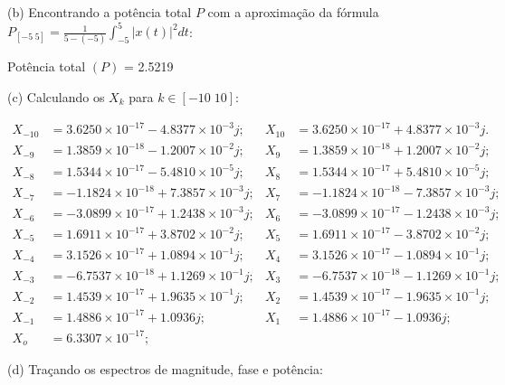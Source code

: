 \documentclass{article}
\begin{document}
\vspace{\baselineskip}

(b) Encontrando a potência total $P$ com a aproximação da fórmula $P_{[-5\;5]} = \frac{1}{5 - (-5)} \int_{-5}^{5} |x(t)|^2 dt $:

\vspace{\baselineskip}

Potência total $(P)$ = 2.5219

\vspace{\baselineskip}

(c) Calculando os $X_{k}$ para $k \in [-10\;10]$:

\begin{align*}
    X_{-10} &=  3.6250 \times 10^{-17} - 4.8377\times 10^{-3}j; & X_{10} &=  3.6250\times 10^{-17} + 4.8377\times 10^{-3}j.\\
    X_{-9} &=  1.3859\times 10^{-18} - 1.2007\times 10^{-2}j;   & X_{9} &=  1.3859\times 10^{-18} + 1.2007\times 10^{-2}j;\\
    X_{-8} &=  1.5344\times 10^{-17} - 5.4810\times 10^{-5}j;   & X_{8} &=  1.5344\times 10^{-17} + 5.4810\times 10^{-5}j;\\
    X_{-7} &= -1.1824\times 10^{-18} + 7.3857\times 10^{-3}j;   & X_{7} &= -1.1824\times 10^{-18} - 7.3857\times 10^{-3}j;\\
    X_{-6} &= -3.0899\times 10^{-17} + 1.2438\times 10^{-3}j;   & X_{6} &= -3.0899\times 10^{-17} - 1.2438\times 10^{-3}j;\\
    X_{-5} &=  1.6911\times 10^{-17} + 3.8702\times 10^{-2}j;   & X_{5} &=  1.6911\times 10^{-17} - 3.8702\times 10^{-2}j;\\
    X_{-4} &=  3.1526\times 10^{-17} + 1.0894\times 10^{-1}j;   & X_{4} &=  3.1526\times 10^{-17} - 1.0894\times 10^{-1}j;\\
    X_{-3} &= -6.7537\times 10^{-18} + 1.1269\times 10^{-1}j;   & X_{3} &= -6.7537\times 10^{-18} - 1.1269\times 10^{-1}j;\\
    X_{-2} &=  1.4539\times 10^{-17} + 1.9635\times 10^{-1}j;   & X_{2} &=  1.4539\times 10^{-17} - 1.9635\times 10^{-1}j;\\
    X_{-1} &=  1.4886\times 10^{-17} + 1.0936j;                  & X_{1} &=  1.4886\times 10^{-17} - 1.0936j;\\
    X_{o} &= 6.3307\times 10^{-17}; &
\end{align*}

(d) Traçando os espectros de magnitude, fase e potência:
\end{document}
